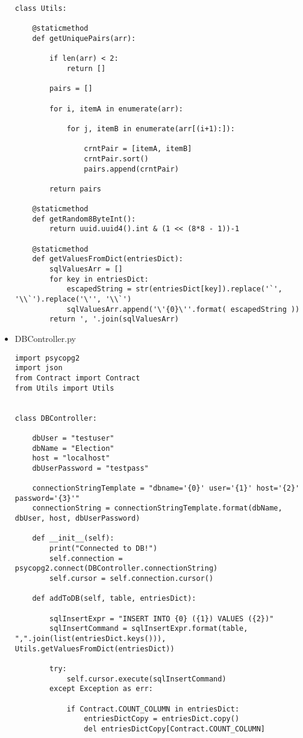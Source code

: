 \begin{itemize}
\begin{lstlisting}[style=py]
class Utils:

	@staticmethod
	def getUniquePairs(arr):

		if len(arr) < 2:
			return []

		pairs = []

		for i, itemA in enumerate(arr):

			for j, itemB in enumerate(arr[(i+1):]):

				crntPair = [itemA, itemB]
				crntPair.sort()
				pairs.append(crntPair)

		return pairs

	@staticmethod
	def getRandom8ByteInt():
		return uuid.uuid4().int & (1 << (8*8 - 1))-1

	@staticmethod
	def getValuesFromDict(entriesDict):
		sqlValuesArr = []
		for key in entriesDict:
			escapedString = str(entriesDict[key]).replace('`', '\\`').replace('\'', '\\`')
			sqlValuesArr.append('\'{0}\''.format( escapedString ))
		return ', '.join(sqlValuesArr)
\end{lstlisting}

\item DBController.py \\

\begin{lstlisting}[style=py]
import psycopg2
import json
from Contract import Contract
from Utils import Utils


class DBController:

	dbUser = "testuser"
	dbName = "Election"
	host = "localhost"
	dbUserPassword = "testpass"

	connectionStringTemplate = "dbname='{0}' user='{1}' host='{2}' password='{3}'"
	connectionString = connectionStringTemplate.format(dbName, dbUser, host, dbUserPassword)

	def __init__(self):
		print("Connected to DB!")
		self.connection = psycopg2.connect(DBController.connectionString)    
		self.cursor = self.connection.cursor()

	def addToDB(self, table, entriesDict):
		
		sqlInsertExpr = "INSERT INTO {0} ({1}) VALUES ({2})"
		sqlInsertCommand = sqlInsertExpr.format(table, ",".join(list(entriesDict.keys())), Utils.getValuesFromDict(entriesDict))

		try:
			self.cursor.execute(sqlInsertCommand)
		except Exception as err:
			
			if Contract.COUNT_COLUMN in entriesDict:
				entriesDictCopy = entriesDict.copy()
				del entriesDictCopy[Contract.COUNT_COLUMN]


\end{lstlisting}
\end{itemize}
